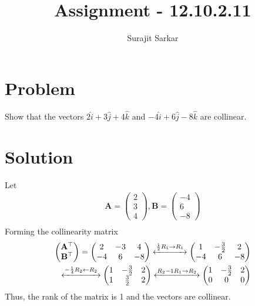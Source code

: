 \documentclass[12pt]{article}
\title{\mytitle}
\title{
Assignment - 12.10.2.11
}
\author{Surajit Sarkar}
\newcommand{\myvec}[1]{\ensuremath{\begin{pmatrix}#1\end{pmatrix}}}
\let\vec\mathbf
\begin{document}
\maketitle
\tableofcontents
\bigskip
\section{\textbf{Problem}}
Show that the vectors $2\hat{i}+3\hat{j}+4\hat{k}$ and $-4\hat{i}+6\hat{j}-8\hat{k}$ are collinear.
\section{\textbf{Solution}}
\fi
Let
\begin{align}
\vec{A}=\myvec{2\\3\\4},\vec{B}=\myvec{-4\\6\\-8}\\
 \end{align}
 Forming the collinearity matrix
 \begin{align}        
\myvec{\vec{A}^{\top}\\ \vec{B}^{\top}}=\myvec{2&-3&4\\-4&6&-8}
 \xleftrightarrow{\frac{1}{2}R_1\to R_1}\myvec{1&-\frac{3}{2}&2\\-4&6&-8}\\
\xleftrightarrow{-\frac{1}{4}R_2\leftarrow R_2}\myvec{1&-\frac{3}{2}&2\\1&\frac{3}{2}&2}
\xleftrightarrow{R_2-1R_1\to R_2}\myvec{1&-\frac{3}{2}&2\\0&0&0}
\end{align}
Thus, the rank of the matrix is 1 and the vectors are collinear.
\end{document}
